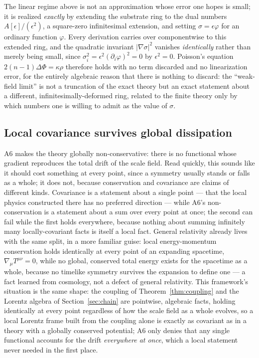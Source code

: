 \documentclass[pdflatex,sn-mathphys-num]{sn-jnl}
\theoremstyle{thmstyleone}
\theoremstyle{thmstylethree}
\theoremstyle{thmstyletwo}
\begin{document}
The linear regime above is not an approximation whose error one hopes is
small; it is realized \emph{exactly} by extending the substrate ring to
the dual numbers $A[\epsilon]/(\epsilon^2)$, a square-zero infinitesimal
extension, and setting $\sigma = \epsilon\varphi$ for an ordinary
function $\varphi$. Every derivation carries over componentwise to this
extended ring, and the quadratic invariant $|\nabla\sigma|^2$ vanishes
\emph{identically} rather than merely being small, since
$\sigma_i^2 = \epsilon^2(\partial_i\varphi)^2 = 0$ by $\epsilon^2=0$.
Poisson's equation $2(n-1)\Delta\Phi = \kappa\rho$ therefore holds with
no term discarded and no linearization error, for the entirely
algebraic reason that there is nothing to discard: the ``weak-field
limit'' is not a truncation of the exact theory but an exact statement
about a different, infinitesimally-deformed ring, related to the finite
theory only by which numbers one is willing to admit as the value of
$\sigma$.

\subsection{Local covariance survives global dissipation}

A6 makes the theory globally non-conservative: there is no functional
whose gradient reproduces the total drift of the scale field. Read
quickly, this sounds like it should cost something at every point, since
a symmetry usually stands or falls as a whole; it does not, because
conservation and covariance are claims of different kinds. Covariance is
a statement about a single point — that the local physics constructed
there has no preferred direction — while A6's non-conservation is a
statement about a sum over every point at once; the second can fail
while the first holds everywhere, because nothing about summing
infinitely many locally-covariant facts is itself a local fact. General
relativity already lives with the same split, in a more familiar guise:
local energy-momentum conservation holds identically at every point of
an expanding spacetime, $\nabla_\mu T^{\mu\nu}=0$, while no global,
conserved total energy exists for the spacetime as a whole, because no
timelike symmetry survives the expansion to define one — a fact learned
from cosmology, not a defect of general relativity. This framework's
situation is the same shape: the coupling of Theorem~\ref{thm:coupling}
and the Lorentz algebra of Section~\ref{sec:chain} are pointwise,
algebraic facts, holding identically at every point regardless of how
the scale field as a whole evolves, so a local Lorentz frame built from
the coupling alone is exactly as covariant as in a theory with a
globally conserved potential; A6 only denies that any single functional
accounts for the drift \emph{everywhere at once}, which a local
statement never needed in the first place.
\end{document}
